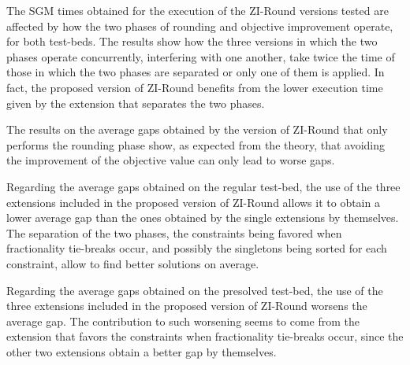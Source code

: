 \documentclass[a4paper,12pt,twoside]{scrbook}
\begin{document}
The SGM times obtained for the execution of the ZI-Round versions tested are affected by how the two phases of rounding and objective improvement operate, for both test-beds. The results show how the three versions in which the two phases operate concurrently, interfering with one another, take twice the time of those in which the two phases are separated or only one of them is applied.
In fact, the proposed version of ZI-Round benefits from the lower execution time given by the extension that separates the two phases. \par

The results on the average gaps obtained by the version of ZI-Round that only performs the rounding phase show, as expected from the theory, that avoiding the improvement of the objective value can only lead to worse gaps. \par 

Regarding the average gaps obtained on the regular test-bed, the use of the three extensions included in the proposed version of ZI-Round allows it to obtain a lower average gap than the ones obtained by the single extensions by themselves. The separation of the two phases, the constraints being favored when fractionality tie-breaks occur, and possibly the singletons being sorted for each constraint, allow to find better solutions on average. \par 

Regarding the average gaps obtained on the presolved test-bed, the use of the three extensions included in the proposed version of ZI-Round worsens the average gap. The contribution to such worsening seems to come from the extension that favors the constraints when fractionality tie-breaks occur, since the other two extensions obtain a better gap by themselves. \par 
\end{document}
